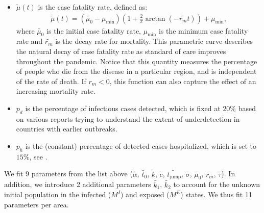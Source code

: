 \documentclass[msom,blindrev]{informs3} %
\begin{document}
\begin{APPENDICES}
\begin{itemize}[topsep=0pt,itemsep=0pt]
    \item $\widetilde{\mu}(t)$ is the case fatality rate, defined as:
    \begin{align*}
        \widetilde{\mu}(t) = \left(\widetilde{\mu_0} - \mu_{\min}\right)\left(1 + \frac{2}{\pi}\arctan\left(-\widetilde{r_m} t\right)\right) + \mu_{\min},
\end{align*}
where $\widetilde{\mu_0}$ is the initial case fatality rate, $\mu_{\min}$ is the minimum case fatality rate and $\widetilde{r_m}$ is the decay rate for mortality. This parametric curve describes the natural decay of case fatality rate as standard of care improves throughout the pandemic. Notice that this quantity measures the percentage of people who die from the disease in a particular region, and is independent of the rate of death. If $r_m<0$, this function can also capture the effect of an increasing mortality rate.
    \item $p_d$ is the percentage of infectious cases detected, which is fixed at $20\%$ based on various reports trying to understand the extent of underdetection in countries with earlier outbreaks. 
    \item $p_h$ is the (constant) percentage of detected cases hospitalized, which is set to $15\%$, see .
\end{itemize}

We fit 9 parameters from the list above ($\widetilde{\alpha}$,  $\widetilde{t_0}$, $\widetilde{k}$,
 $\widetilde{c}$, $\widetilde{t_\text{jump}}$, $\widetilde{\sigma}$, $\widetilde{\mu_0}$, $\widetilde{r_m}$, $\widetilde{\tau}$). In addition, we introduce 2 additional parameters $\widetilde{k_1}$, $\widetilde{k_2}$ to account for the unknown initial population in the infected ($M^I$) and exposed ($M^E$) states. We thus fit 11 parameters per area.


\end{APPENDICES}
\end{document}

